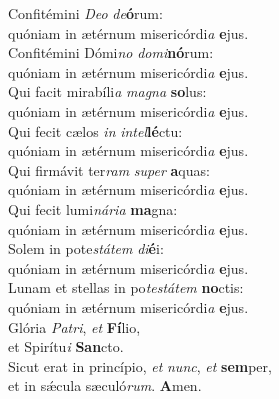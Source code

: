 \evenverse Confitémini \textit{De}\textit{o} \textit{de}\textbf{ó}rum:~\*\\
\evenverse quóniam in ætérnum misericórdi\textit{a} \textbf{e}jus.\\
\oddverse Confitémini Dómi\textit{no} \textit{do}\textit{mi}\textbf{nó}rum:~\*\\
\oddverse quóniam in ætérnum misericórdi\textit{a} \textbf{e}jus.\\
\evenverse Qui facit mirabíli\textit{a} \textit{ma}\textit{gna} \textbf{so}lus:~\*\\
\evenverse quóniam in ætérnum misericórdi\textit{a} \textbf{e}jus.\\
\oddverse Qui fecit cælos \textit{in} \textit{in}\textit{tel}\textbf{lé}ctu:~\*\\
\oddverse quóniam in ætérnum misericórdi\textit{a} \textbf{e}jus.\\
\evenverse Qui firmávit ter\textit{ram} \textit{su}\textit{per} \textbf{a}quas:~\*\\
\evenverse quóniam in ætérnum misericórdi\textit{a} \textbf{e}jus.\\
\oddverse Qui fecit lumi\textit{ná}\textit{ri}\textit{a} \textbf{ma}gna:~\*\\
\oddverse quóniam in ætérnum misericórdi\textit{a} \textbf{e}jus.\\
\evenverse Solem in pote\textit{stá}\textit{tem} \textit{di}\textbf{é}i:~\*\\
\evenverse quóniam in ætérnum misericórdi\textit{a} \textbf{e}jus.\\
\oddverse Lunam et stellas in po\textit{te}\textit{stá}\textit{tem} \textbf{no}ctis:~\*\\
\oddverse quóniam in ætérnum misericórdi\textit{a} \textbf{e}jus.\\
\evenverse Glória \textit{Pa}\textit{tri}, \textit{et} \textbf{Fí}lio,~\*\\
\evenverse et Spirítu\textit{i} \textbf{San}cto.\\
\oddverse Sicut erat in princípio, \textit{et} \textit{nunc}, \textit{et} \textbf{sem}per,~\*\\
\oddverse et in sǽcula sæculó\textit{rum}. \textbf{A}men.\\

